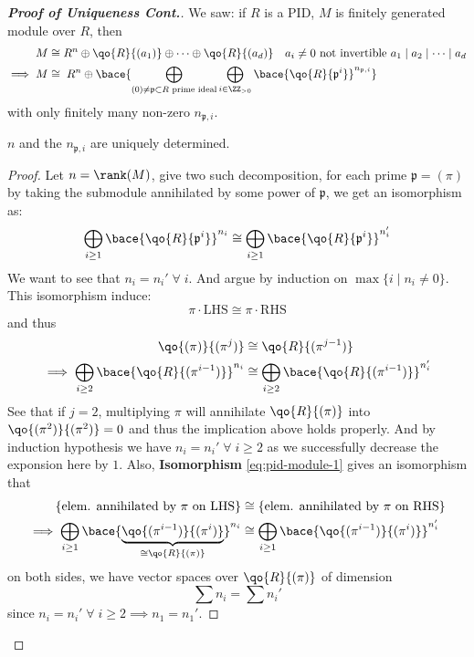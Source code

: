 \begin{proof}[\textbf{Proof of Uniqueness Cont.}]
	We saw: if \( R \) is a PID, \( M \) is finitely generated module over \( R \), then
	\[
		\begin{aligned}
			M          & \cong R^n \oplus \qo{R}{(a_1)} \oplus \cdots \oplus \qo{R}{(a_d)} \quad a_i \ne 0\text{
			not invertible } a_1 \mid a_2 \mid \cdots \mid a_d                                                   \\
			\implies M & \cong \; R^n \oplus \bace{\bigoplus_{(0)\ne \mathfrak p \subset R \text{ prime ideal}}
			\bigoplus_{i\in \ZZ_{>0}}\bace{\qo{R}{\mathfrak p^i} }^{n_{\mathfrak p,i}}}
		\end{aligned}
	\]
	with only finitely many non-zero \( n_{\mathfrak p,i} \).
	\begin{claim}
		\( n \) and the \( n_{\mathfrak p, i} \) are uniquely determined.
	\end{claim}

	\begin{proof}
		Let \( n = \rank(M) \), give two such decomposition, for each prime \( \mathfrak p = (\pi) \) by taking
		the submodule annihilated by some power of \( \mathfrak p \), we get an isomorphism as:
		\begin{equation}
			\label{eq:pid-module-1}
			\bigoplus_{i\geq 1} \bace{\qo{R}{\mathfrak p^i}}^{n_i} \cong \bigoplus_{i\geq 1}
			\bace{\qo{R}{\mathfrak p^i}}^{n'_i}
		\end{equation}
		We want to see that \( n_i = n_i' \; \forall \; i \). And argue by induction on \( \max\{i \; |
		\; n_i \ne 0\} \). This isomorphism induce:
		\[
			\pi \cdot \text{LHS} \cong \pi \cdot \text{RHS}
		\]
		and thus
		\[
			\begin{aligned}
				\qo{(\pi)}{(\pi^j)}                                            & \cong \qo{R}{(\pi^{j-1})} \\
				\implies \bigoplus_{i \geq 2} \bace{\qo{R}{(\pi^{i-1})}}^{n_i} & \cong \bigoplus_{i
					\geq 2} \bace{\qo{R}{ (\pi^{i-1})}}^{n'_i}
			\end{aligned}
		\]
		See that if \( j = 2 \), multiplying \( \pi \) will annihilate \( \qo{R}{(\pi)} \) into \(
		\qo{(\pi^2)}{(\pi^2)} = 0 \) and thus the implication above holds properly.
		And by induction hypothesis we have \( n_i = n_i' \; \forall \; i \geq 2 \) as we successfully
		decrease the exponsion here by \( 1 \). Also,
		\textbf{Isomorphism} \ref{eq:pid-module-1} gives an isomorphism that
		\[
			\begin{aligned}
				\{\text{elem. annihilated by } \pi \text{ on LHS}\}                                                      & \cong \{\text{elem. annihilated by } \pi \text{ on RHS}\}           \\
				\implies \bigoplus_{i\geq 1} \bace{ \underbrace{\qo{(\pi^{i-1})}{(\pi^i)}}_{\cong \qo{R}{(\pi)}} }^{n_i} & \cong \bigoplus_{i\geq 1} \bace{ \qo{(\pi^{i-1})}{(\pi^i)} }^{n_i'}
			\end{aligned}
		\]
		on both sides, we have vector spaces over \( \qo{R}{(\pi)} \) of dimension
		\[
			\sum n_i = \sum n_i'
		\]
		since \( n_i = n_i' \; \forall \; i \geq 2 \implies n_1 = n_1' \).
	\end{proof}


\end{proof}
